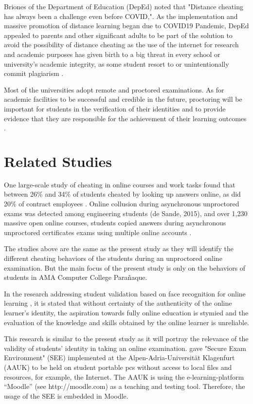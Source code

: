 Briones of the Department of Education (DepEd) noted that "Distance cheating has always been a challenge even before COVID,".
As the implementation and massive promotion of distance learning began due to COVID19 Pandemic, DepEd appealed to parents and other significant adults to be part of the solution to avoid the possibility of distance cheating as the use of the internet for research and academic purposes has given birth to a big threat in every school or university’s academic integrity, as some student resort to or unintentionally commit plagiarism \cite{quieta2020plagiarism}.

Most of the universities adopt remote and proctored examinations. As for academic facilities to be successful and credible in the future, proctoring will be important for students in the verification of their identities and to provide evidence that they are responsible for the achievement of their learning outcomes \cite{dela2015massive}.

\section{Related Studies}

One large-scale study of cheating in online courses and work tasks found that between 26\% and 34\% of students cheated by looking up answers online, as did 20\% of contract employees \cite{corrigan2015deterring}.
Online collusion during asynchronous unproctored exams was detected among engineering students (de Sande, 2015), and over 1,230 massive open online courses, students copied answers during asynchronous unproctored certificates exams using multiple online accounts \cite{northcutt2016detecting}.

The studies above are the same as the present study as they will identify the different cheating behaviors of the students during an unproctored online examination.
But the main focus of the present study is only on the behaviors of students in AMA Computer College Parañaque.

In the research addressing student validation based on face recognition for online learning \cite{labayen2014smowl}, it is stated that without certainty of the authenticity of the online learner’s identity, the aspiration towards fully online education is stymied and the evaluation of the knowledge and skills obtained by the online learner is unreliable.

This research is similar to the present study as it will portray the relevance of the validity of students’ identity in taking an online examination.
 gave "Secure Exam Environment" (SEE) implemented at the Alpen-Adria-Universität Klagenfurt (AAUK) to be held on student portable pcs without access to local files and resources, for example, the Internet.
The AAUK is using the e-learning-platform “Moodle” (see http://moodle.com) as a teaching and testing tool.
Therefore, the usage of the SEE is embedded in Moodle.

